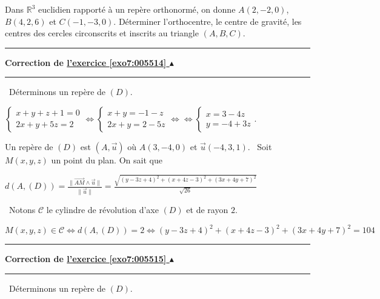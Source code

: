 \documentclass[11pt,a4paper]{article}
\newcommand{\Rr}{\mathbb{R}} \newcommand{\R}{\mathbb{R}}
\newcounter{exo}
\newcommand{\correction}[1]{\hypertarget{cor7:#1}{}\label{cor7:#1}{\bf Correction de \hyperlink{exo7:#1}{l'exercice \ref{exo7:#1} $\blacktriangle$}}\vspace{1mm}\hrule\vspace{1mm}}
\newcommand{\fincorrection}{\vspace{1mm}\hrule\vspace*{7mm}}
\begin{document}
Dans $\Rr^3$ euclidien rapporté à un repère orthonormé, on donne $A(2,-2,0)$, $B(4,2,6)$ et 
$C(-1,-3,0)$. Déterminer l'orthocentre, le centre de gravité, les centres des cercles circonscrits et inscrits au triangle $(A,B,C)$.
\begin{center}
\end{center}
\fincorrection
\correction{005514}
\textbullet~Déterminons un repère de $(D)$.
\begin{center}
$\left\{
\begin{array}{l}
x+y+z+1=0\\
2x+y+5z=2
\end{array}
\right.\Leftrightarrow\left\{
\begin{array}{l}
x+y=-1-z\\
2x+y=2-5z
\end{array}
\right.\Leftrightarrow\Leftrightarrow\left\{
\begin{array}{l}
x=3-4z\\
y=-4+3z
\end{array}
\right.$. 
\end{center}
Un repère de $(D)$ est $\left(A,\overrightarrow{u}\right)$ où $A(3,-4,0)$ et $\overrightarrow{u}(-4,3,1)$.
\textbullet~Soit $M(x,y,z)$ un point du plan. On sait que

\begin{center}
$d(A,(D))=\frac{\|\overrightarrow{AM}\wedge\overrightarrow{u}\|}{\|\overrightarrow{u}\|}=\frac{\sqrt{(y-3z+4)^2+(x+4z-3)^2+(3x+4y+7)^2}}{\sqrt{26}}$
\end{center}
\textbullet~Notons $\mathcal{C}$ le cylindre de révolution d'axe $(D)$ et de rayon $2$.
\begin{center}
$M(x,y,z)\in\mathcal{C}\Leftrightarrow d(A,(D))=2\Leftrightarrow(y-3z+4)^2+(x+4z-3)^2+(3x+4y+7)^2=104$
\end{center}

\begin{center}
\end{center}
\fincorrection
\correction{005515}
\textbullet~Déterminons un repère de $(D)$.
\end{document}
